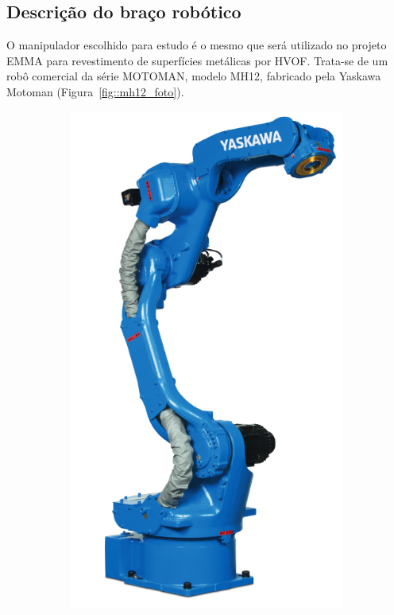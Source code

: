 \subsection{Descrição do braço robótico} \label{sec::descricao_mh12}

O manipulador escolhido para estudo é o mesmo que será utilizado no projeto EMMA
para revestimento de superfícies metálicas por HVOF. Trata-se de um robô
comercial da série MOTOMAN, modelo MH12, fabricado pela Yaskawa Motoman
(Figura~\ref{fig::mh12_foto}).

\begin{figure}[h]
    \centering
    \begin{subfigure}[b]{0.3\textwidth}
        \includegraphics[width=\textwidth]{figs/mh12_foto}

\end{subfigure}
\end{figure}
